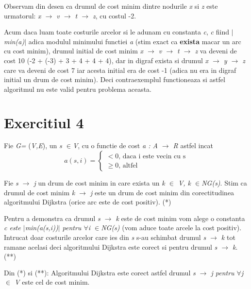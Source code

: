\documentclass{article}
\begin{document}
     Observam din desen ca drumul de cost minim dintre nodurile \textit{x} si \textit{z} este urmatorul: \textit{x  $\rightarrow$ v  $\rightarrow$ t  $\rightarrow$ z}, cu costul -2.
     
      Acum daca luam toate costurile arcelor si le adunam cu constanta \textit{c}, \textit{c}
     fiind \textit{$\mid$min(a)$\mid$} adica modulul minimului functiei \textit{a} (stim exact ca \textbf{exista} macar un arc cu cost minim), drumul initial de cost minim \textit{x  $\rightarrow$ v  $\rightarrow$ t  $\rightarrow$ z} va deveni de cost 10 (-2 + (-3) + 3 + 4 + 4 + 4), dar in digraf exista si drumul \textit{x  $\rightarrow$ y  $\rightarrow$ z} care va deveni de cost 7 iar acesta initial era de cost -1 (adica nu era in digraf initial un drum de cost minim). Deci contraexemplul functioneaza si astfel algoritmul nu este valid pentru problema aceasta.
\section*{Exercitiul 4}
    \quad Fie \textit{G=} (\textit{V,E}), un \textit{s $\in$V}, cu o functie de cost \textit{a : A $\rightarrow$ R} astfel incat 
    $$
    a(s,i) = \begin{cases}
        <0  \text{, daca i este vecin cu s} \\
        \geq 0  \text{, altfel}
    \end{cases}
    $$
 
    \quad Fie \textit{s $\rightarrow$ j} un drum de cost minim in care exista un \textit{k $\in$ V, k $\in$N\tiny{G}\large(s)}. Stim ca drumul de cost minim \textit{k $\rightarrow$ j} este un drum de cost minim din corectitudinea algoritmului Dijkstra (orice arc este de cost positiv). (*)
    
    \quad Pentru a demonstra ca drumul \textit{s $\rightarrow$ k} este de cost minim vom alege o constanta \textit{c este $\mid$min(a(s,i))$\mid$ pentru $\forall$i $\in$N\tiny{G}\large(s)} (vom aduce toate arcele la cost positiv). Intrucat doar costurile arcelor care ies din \textit{s} s-au schimbat drumul   \textit{s $\rightarrow$ k} tot ramane acelasi deci algoritmului Dijkstra este corect si pentru drumul \textit{s $\rightarrow$ k}. (**)
    
    \quad Din (*) si (**): Algoritmului Dijkstra este corect astfel drumul \textit{s $\rightarrow$ j pentru $\forall$j $\in$ V} este cel de cost minim.
      
\end{document}
